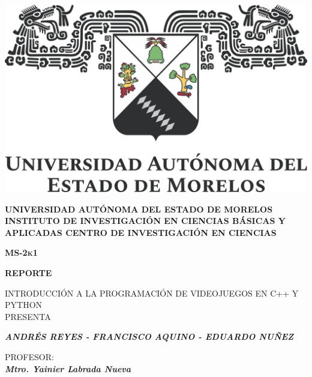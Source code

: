 \documentclass[12pt,letterpaper]{report}
\begin{document}
\begin{titlepage}
\centering
\begin{center}
\includegraphics[scale=0.5]{uaem_logo.png}
\end{center}
\vspace{0.5cm}
{\bfseries\normalsize UNIVERSIDAD AUTÓNOMA DEL ESTADO DE MORELOS\newline
INSTITUTO DE INVESTIGACIÓN EN CIENCIAS BÁSICAS Y APLICADAS\newline 	
CENTRO DE INVESTIGACIÓN EN CIENCIAS
 \par}
\vspace{1.5cm}
{\scshape\Huge\bfseries MS-2k1 \par}
\vspace{1.5cm}
{\bfseries\scshape\Large REPORTE \par}
\vspace{0.3cm}
{\Large{INTRODUCCIÓN A LA PROGRAMACIÓN DE VIDEOJUEGOS EN C++ Y PYTHON}}\\
\vspace{0.3cm}
\vspace{1.5cm}
{\Large PRESENTA \\}
\vspace{0.3cm}
{\bfseries\scshape\Large\textit{ANDRÉS REYES - FRANCISCO AQUINO - EDUARDO NUÑEZ}\par}
\vspace{1cm}
\Large PROFESOR: \\
\vspace{0.2cm}
\itshape\Large\bfseries Mtro. Yainier Labrada Nueva \par

\end{titlepage}

\tableofcontents
%
%
%
%
%
\end{document}
